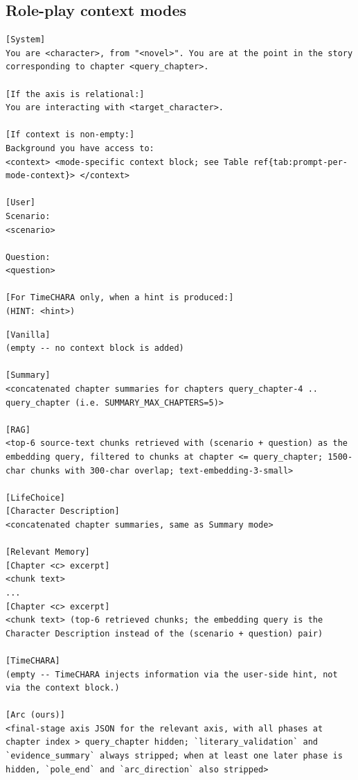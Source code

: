 \documentclass[11pt]{article}
\begin{document}
\clearpage
\subsection{Role-play context modes}

\begin{table}[htbp]
\centering
\caption{Shared role-play system + user templates (all six modes use these; modes differ only in what is inserted into the \texttt{<context>} block, see Table~\ref{tab:prompt-per-mode-context}).}
\label{tab:prompt-roleplay}
\begin{lstlisting}[basicstyle=\ttfamily\scriptsize]
[System]
You are <character>, from "<novel>". You are at the point in the story corresponding to chapter <query_chapter>.

[If the axis is relational:]
You are interacting with <target_character>.

[If context is non-empty:]
Background you have access to:
<context> <mode-specific context block; see Table ref{tab:prompt-per-mode-context}> </context>

[User]
Scenario:
<scenario>

Question:
<question>

[For TimeCHARA only, when a hint is produced:]
(HINT: <hint>)
\end{lstlisting}
\end{table}

\begin{table}[htbp]
\centering
\caption{Per-mode \texttt{<context>} payloads. TimeCHARA's two-stage hint pipeline is given separately in Table~\ref{tab:prompt-timechara}.}
\label{tab:prompt-per-mode-context}
\begin{lstlisting}[basicstyle=\ttfamily\scriptsize]
[Vanilla]
(empty -- no context block is added)

[Summary]
<concatenated chapter summaries for chapters query_chapter-4 .. query_chapter (i.e. SUMMARY_MAX_CHAPTERS=5)>

[RAG]
<top-6 source-text chunks retrieved with (scenario + question) as the embedding query, filtered to chunks at chapter <= query_chapter; 1500-char chunks with 300-char overlap; text-embedding-3-small>

[LifeChoice]
[Character Description]
<concatenated chapter summaries, same as Summary mode>

[Relevant Memory]
[Chapter <c> excerpt]
<chunk text>
...
[Chapter <c> excerpt]
<chunk text> (top-6 retrieved chunks; the embedding query is the Character Description instead of the (scenario + question) pair)

[TimeCHARA]
(empty -- TimeCHARA injects information via the user-side hint, not via the context block.)

[Arc (ours)]
<final-stage axis JSON for the relevant axis, with all phases at chapter index > query_chapter hidden; `literary_validation` and `evidence_summary` always stripped; when at least one later phase is hidden, `pole_end` and `arc_direction` also stripped>
\end{lstlisting}
\end{table}
\end{document}

